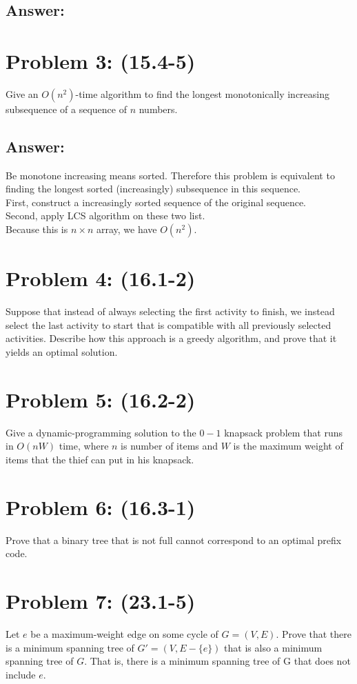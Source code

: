 \documentclass[a4paper]{article}
\begin{document}
\subsection*{Answer:}

\section*{Problem 3: (15.4-5)} Give an $O(n^2)$-time algorithm to find the longest monotonically increasing subsequence of a sequence of $n$ numbers.
\subsection*{Answer:}
Be monotone increasing means sorted. Therefore this problem is equivalent to finding the longest sorted (increasingly) subsequence in this sequence.\\
First, construct a increasingly sorted sequence of the original sequence.\\
Second, apply LCS algorithm on these two list.\\
Because this is $n\times n$ array, we have $O(n^2)$.

\section*{Problem 4: (16.1-2)} Suppose that instead of always selecting the first activity to finish, we instead select the last activity to start that is compatible with all previously selected activities. Describe how this approach is a greedy algorithm, and prove that it yields an optimal solution.

\section*{Problem 5: (16.2-2)} Give a dynamic-programming solution to the $0-1$ knapsack problem that runs in $O(n W)$ time, where $n$ is number of items and $W$ is the maximum weight of items that the thief can put in his knapsack.

\section*{Problem 6: (16.3-1)} Prove that a binary tree that is not full cannot correspond to an optimal prefix code.

\section*{Problem 7: (23.1-5)} Let $e$ be a maximum-weight edge on some cycle of $G = (V, E)$. Prove that there is a minimum spanning tree of $G′ = (V, E -\{e\})$ that is also a minimum spanning tree of $G$. That is, there is a minimum spanning tree of G that does not include $e$.
 
\end{document}
